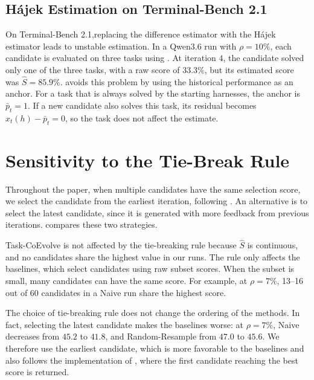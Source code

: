 \documentclass{article} %
\begin{document}
\subsection{H\'ajek Estimation on Terminal-Bench 2.1}
On Terminal-Bench 2.1,replacing the difference estimator with the H\'ajek estimator leads to unstable estimation. In a Qwen3.6 run with $\rho{=}10\%$, each candidate is evaluated on three tasks using . At iteration $4$, the candidate solved only one of the three tasks, with a raw score of $33.3\%$, but its estimated score was $\hat{S}=85.9\%$.
 avoids this problem by using the historical performance as an anchor. For a task that is always solved by the starting harnesses, the anchor is $\bar{p}_t=1$. If a new candidate also solves this task, its residual becomes $x_t(h)-\bar{p}_t=0$, so the task does not affect the estimate.




\section{Sensitivity to the Tie-Break Rule}
\label{app:tiebreak}

Throughout the paper, when multiple candidates have the same selection score, we select the candidate from the earliest iteration, following . An alternative is to select the latest candidate, since it is generated with more feedback from previous iterations.  compares these two strategies.




Task-CoEvolve is not affected by the tie-breaking rule because $\hat{S}$ is continuous, and no candidates share the highest value in our runs. The rule only affects the baselines, which select candidates using raw subset scores. When the subset is small, many candidates can have the same score. For example, at $\rho{=}7\%$, 13--16 out of 60 candidates in a Naive run share the highest score.

The choice of tie-breaking rule does not change the ordering of the methods. In fact, selecting the latest candidate makes the baselines worse: at $\rho{=}7\%$, Naive decreases from $45.2$ to $41.8$, and Random-Resample from $47.0$ to $45.6$. We therefore use the earliest candidate, which is more favorable to the baselines and also follows the implementation of \citet{lee2026meta}, where the first candidate reaching the best score is returned.
\end{document}
